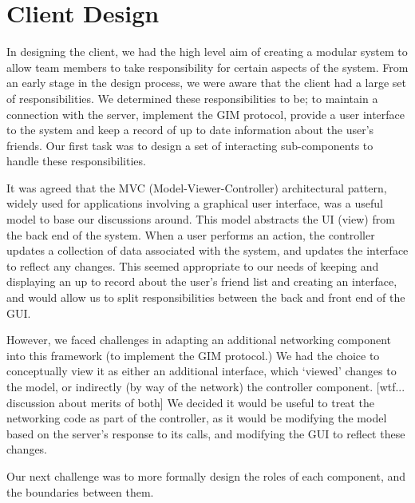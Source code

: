 \section{Client Design}
In designing the client, we had the high level aim of creating a modular system to allow team members to take responsibility for certain aspects of the system. From an early stage in the design process, we were aware that the client had a large set of responsibilities. We determined these responsibilities to be;  to maintain a connection with the server, implement the GIM protocol, provide a user interface to the system and keep a record of up to date information about the user’s friends. Our first task was to design a set of interacting sub-components to handle these responsibilities.

It was agreed that the MVC (Model-Viewer-Controller) architectural pattern, widely used for applications involving a graphical user interface, was a useful model to base our discussions around. This model abstracts the UI (view) from the back end of the system. When a user performs an action, the controller updates a collection of data associated with the system, and updates the interface to reflect any changes. This seemed appropriate to our needs of keeping and displaying an up to record about the user’s friend list and creating an interface, and would allow us to split responsibilities between the back and front end of the GUI. 

However, we faced challenges in adapting an additional networking component into this framework (to implement the GIM protocol.) We had the choice to conceptually view it as either an additional interface, which ‘viewed’ changes to the model, or indirectly (by way of the network) the controller component. [wtf... discussion about merits of both] We decided it would be useful to treat the networking code as part of the controller, as it would be modifying the model based on the server’s response to its calls, and modifying the GUI to reflect these changes.
	
Our next challenge was to more formally design the roles of each component, and the boundaries between them. 
